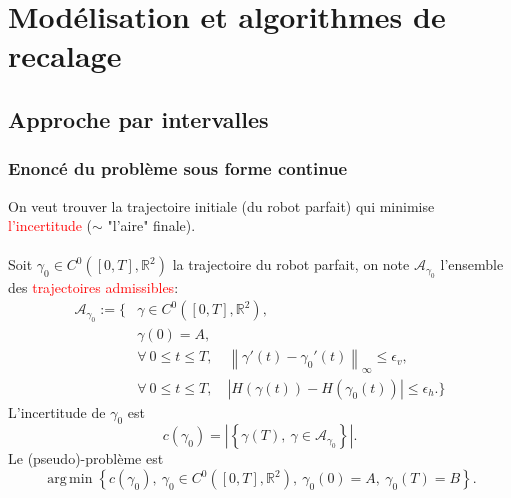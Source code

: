 \documentclass[11pt]{beamer}
\newcommand{\R}{\mathbb{R}}
\DeclareMathOperator*{\argmin}{arg\,min}
\begin{document}
\section{Modélisation et algorithmes de recalage}
\subsection{Approche par intervalles}

\begin{frame}

\frametitle{Enoncé du problème sous forme continue}

On veut trouver la trajectoire initiale (du robot parfait) qui minimise \textcolor{red}{l'incertitude} ($\sim$ "l'aire" finale). \\
~\\
Soit $\gamma_0 \in C^0( [0,T], \R^2)$ la trajectoire du robot parfait, on note $\mathcal{A}_{\gamma_0}$ l'ensemble des \textcolor{red}{trajectoires admissibles}:
\[
	\begin{array}{ll}
		\mathcal{A}_{\gamma_0} :=   \Big\{ &\gamma \in C^0( [0,T], \R^2), \\
			& \gamma(0) = A, \\
			& \forall \ 0 \le t \le T, \quad \left\|  \gamma'(t)  - \gamma_0'(t) \right\|_{\infty} \le \epsilon_v, \\
			& \forall \ 0 \le t \le T, \quad \left| H(\gamma(t))  - H(\gamma_0(t)) \right| \le \epsilon_h. \Big\}
			\end{array}
\]
L'incertitude de $\gamma_0$ est
\[
	c(\gamma_0) = \left| \left\{ \gamma(T), \ \gamma \in \mathcal{A}_{\gamma_0} \right\} \right|.
\]
Le (pseudo)-problème est 
\[
	\argmin \left\{ c(\gamma_0), \ \gamma_0 \in C^0( [0,T], \R^2), \ \gamma_0(0) = A, \ \gamma_0(T) = B \right\}.
\]

\end{frame}


\end{document}
